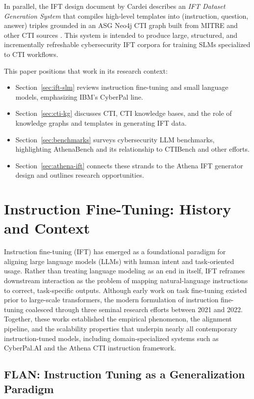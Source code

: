 \documentclass[unnumsec,webpdf,contemporary,large]{oup-authoring-template}
\theoremstyle{thmstyleone}
\theoremstyle{thmstyletwo}
\theoremstyle{thmstylethree}
\begin{document}
In parallel, the IFT design document by Cardei describes an \emph{IFT Dataset Generation System} that compiles high-level templates into (instruction, question, answer) triples grounded in an ASG Neo4j CTI graph built from MITRE and other CTI sources \cite{cardei2025ift}. This system is intended to produce large, structured, and incrementally refreshable cybersecurity IFT corpora for training SLMs specialized to CTI workflows.

This paper positions that work in its research context:
\begin{itemize}
  \item Section~\ref{sec:ift-slm} reviews instruction fine-tuning and small language models, emphasizing IBM's CyberPal line.
  \item Section~\ref{sec:cti-kg} discusses CTI, CTI knowledge bases, and the role of knowledge graphs and templates in generating IFT data.
  \item Section~\ref{sec:benchmarks} surveys cybersecurity LLM benchmarks, highlighting AthenaBench and its relationship to CTIBench and other efforts.
  \item Section~\ref{sec:athena-ift} connects these strands to the Athena IFT generator design and outlines research opportunities.
\end{itemize}


\section{Instruction Fine-Tuning: History and Context}
\label{sec:ift-history}

Instruction fine-tuning (IFT) has emerged as a foundational paradigm for aligning large language models (LLMs) with human intent and task-oriented usage. Rather than treating language modeling as an end in itself, IFT reframes downstream interaction as the problem of mapping natural-language instructions to correct, task-specific outputs. Although early work on task fine-tuning existed prior to large-scale transformers, the modern formulation of instruction fine-tuning coalesced through three seminal research efforts between 2021 and 2022. Together, these works established the empirical phenomenon, the alignment pipeline, and the scalability properties that underpin nearly all contemporary instruction-tuned models, including domain-specialized systems such as CyberPal.AI and the Athena CTI instruction framework.

\subsection{FLAN: Instruction Tuning as a Generalization Paradigm}
\end{document}
